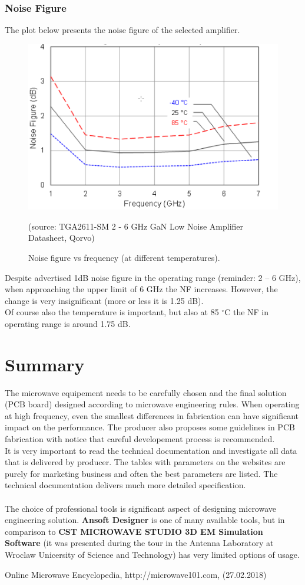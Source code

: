 \documentclass[eng,printmode]{mgr}
\begin{document}
\subsubsection{Noise Figure}
The plot below presents the noise figure of the selected amplifier.
\begin{figure}[h]
	\centering
	\includegraphics[width=0.6\linewidth]{noise}
	\caption{Noise figure vs frequency (at different temperatures).}
	(source: TGA2611-SM 2 - 6 GHz GaN Low Noise Amplifier Datasheet, Qorvo)
	\label{fig:noise}
\end{figure}

Despite advertised 1dB noise figure in the operating range (reminder: 2 -- 6 GHz), when approaching the upper limit of 6 GHz the NF increases. However, the change is very insignificant (more or less it is 1.25 dB).\\
Of course also the temperature is important, but also at 85 $^\circ$C
the NF in operating range is around 1.75 dB.

\section{Summary}
The microwave equipement needs to be carefully chosen and the final solution (PCB board) designed according to microwave engineering rules. When operating at high frequency, even the smallest differences in fabrication can have significant impact on the performance. The producer also proposes some guidelines in PCB fabrication with notice that careful developement process is recommended.\\
It is very important to read the technical documentation and investigate all data that is delivered by producer. The tables with parameters on the websites are purely for marketing business and often the best parameters are listed. The technical documentation delivers much more detailed specification.\\
\\
The choice of professional tools is significant aspect of designing microwave engineering solution. \textbf{Ansoft Designer} is one of many available tools, but in comparison to \textbf{CST MICROWAVE STUDIO 3D EM Simulation Software} (it was presented during the tour in the Antenna Laboratory at Wroclaw Unicersity of Science and Technology) has very limited options of usage.
\begin{thebibliography}{9}
 Online Microwave Encyclopedia, http://microwave101.com,  (27.02.2018)
\end{thebibliography}
\end{document}
